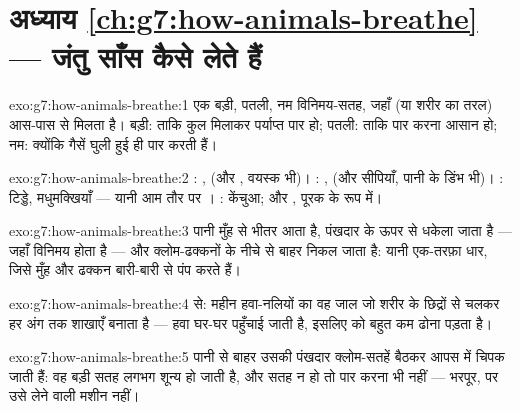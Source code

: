 \section*{अध्याय \ref{ch:g7:how-animals-breathe} --- जंतु साँस कैसे लेते हैं}

\begin{solution}{exo:g7:how-animals-breathe:1}
एक बड़ी, पतली, नम विनिमय-सतह, जहाँ  (या शरीर का तरल) आस-पास से
मिलता है। बड़ी: ताकि कुल मिलाकर पर्याप्त पार हो; पतली: ताकि पार करना
आसान हो; नम: क्योंकि गैसें घुली हुई ही पार करती हैं।
\end{solution}

\begin{solution}{exo:g7:how-animals-breathe:2}
: ,  (और , वयस्क  भी)। : ,
 (और सीपियाँ, पानी के डिंभ भी)। : टिड्डे, मधुमक्खियाँ
--- यानी आम तौर पर । : केंचुआ; और , पूरक के रूप
में।
\end{solution}

\begin{solution}{exo:g7:how-animals-breathe:3}
पानी मुँह से भीतर आता है, पंखदार  के ऊपर से धकेला जाता है ---
जहाँ विनिमय होता है --- और क्लोम-ढक्कनों के नीचे से बाहर निकल जाता है:
यानी एक-तरफ़ा धार, जिसे मुँह और ढक्कन बारी-बारी से पंप करते हैं।
\end{solution}

\begin{solution}{exo:g7:how-animals-breathe:4}
 से: महीन हवा-नलियों का वह जाल जो शरीर के छिद्रों से चलकर हर
अंग तक शाखाएँ बनाता है --- हवा घर-घर पहुँचाई जाती है, इसलिए  को
बहुत कम ढोना पड़ता है।
\end{solution}

\begin{solution}{exo:g7:how-animals-breathe:5}
पानी से बाहर उसकी पंखदार क्लोम-सतहें बैठकर आपस में चिपक जाती हैं: वह
बड़ी सतह लगभग शून्य हो जाती है, और सतह न हो तो पार करना भी नहीं ---
 भरपूर, पर उसे लेने वाली मशीन नहीं।
\end{solution}

